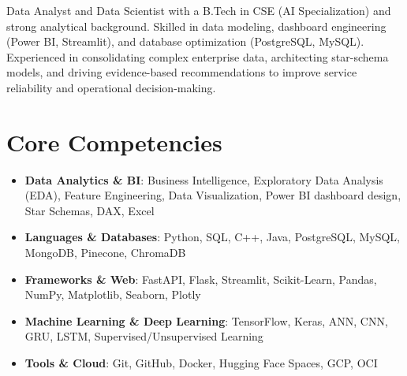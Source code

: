 \documentclass[11pt,a4paper,sans]{moderncv}
\begin{document}
\makecvtitle

\vspace{6pt}
\small{Data Analyst and Data Scientist with a B.Tech in CSE (AI Specialization) and strong analytical background. Skilled in data modeling, dashboard engineering (Power BI, Streamlit), and database optimization (PostgreSQL, MySQL). Experienced in consolidating complex enterprise data, architecting star-schema models, and driving evidence-based recommendations to improve service reliability and operational decision-making.}


\section{Core Competencies}
\vspace{1pt}
\begin{itemize}

\item \textbf{Data Analytics \& BI}: Business Intelligence, Exploratory Data Analysis (EDA), Feature Engineering, Data Visualization, Power BI dashboard design, Star Schemas, DAX, Excel

\item \textbf{Languages \& Databases}: Python, SQL, C++, Java, PostgreSQL, MySQL, MongoDB, Pinecone, ChromaDB

\item \textbf{Frameworks \& Web}: FastAPI, Flask, Streamlit, Scikit-Learn, Pandas, NumPy, Matplotlib, Seaborn, Plotly

\item \textbf{Machine Learning \& Deep Learning}: TensorFlow, Keras, ANN, CNN, GRU, LSTM, Supervised/Unsupervised Learning

\item \textbf{Tools \& Cloud}: Git, GitHub, Docker, Hugging Face Spaces, GCP, OCI

\end{itemize}

\end{document}
